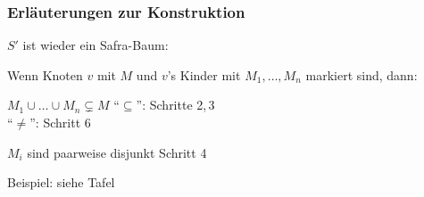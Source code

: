     \begin{frame}
      \frametitle{Erläuterungen zur Konstruktion}

      \begin{Itemize}
        \item
          $S'$ ist wieder ein Safra-Baum:
          \par\smallskip
          \begin{itshape}
            Wenn Knoten $v$ mit $M$ und $v$'s Kinder mit $M_1,\dots,M_n$ markiert sind, dann:
            \begin{Enumerate}
              \item
                $M_1 \cup \dots \cup M_n \subsetneq M$ \hfill ``$\subseteq$'': Schritte 2,\,3\\
                                                       \hfill ``$\neq$'': Schritt 6
              \item
                $M_i$ sind paarweise disjunkt \hfill Schritt 4
            \end{Enumerate}
          \end{itshape}
          \par\bigskip
        \item<2->
          Beispiel: siehe Tafel \Tafel
      \end{Itemize}

    \end{frame}

